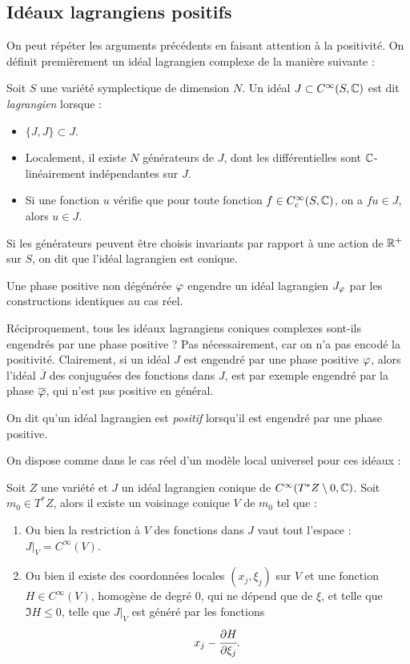 \subsection{Idéaux lagrangiens positifs}
On peut répéter les arguments précédents en faisant attention à la positivité. On définit premièrement un idéal lagrangien complexe de la manière suivante :

\begin{defn}Soit $S$ une variété symplectique de dimension $N$. Un idéal $J \subset C^{\infty}(S,\mathbb{C})$ est dit \emph{lagrangien} lorsque :
	\begin{itemize}
		\item $\{J,J\}\subset J$.
		\item Localement, il existe $N$ générateurs de $J$, dont les différentielles sont $\mathbb{C}$-linéairement indépendantes sur $J$.
		\item Si une fonction $u$ vérifie que pour toute fonction $f \in C^{\infty}_c(S,\mathbb{C})$, on a $fu \in J$, alors $u \in J$.
	\end{itemize}
	Si les générateurs peuvent être choisis invariants par rapport à une action de $\mathbb{R}^+$ sur $S$, on dit que l'idéal lagrangien est conique.
\end{defn}

Une phase positive non dégénérée $\varphi$ engendre un idéal lagrangien $J_{\varphi}$ par les constructions identiques au cas réel.

Réciproquement, tous les idéaux lagrangiens coniques complexes sont-ils engendrés par une phase positive ? Pas nécessairement, car on n'a pas encodé la positivité. Clairement, si un idéal $J$ est engendré par une phase positive $\varphi$, alors l'idéal $\overline{J}$ des conjuguées des fonctions dans $J$, est par exemple engendré par la phase $\overline{\varphi}$, qui n'est pas positive en général.
\begin{defn}
	On dit qu'un idéal lagrangien est \emph{positif} lorsqu'il est engendré par une phase positive.
\end{defn}

On dispose comme dans le cas réel d'un modèle local universel pour ces idéaux :
\begin{lem}
	Soit $Z$ une variété et $J$ un idéal lagrangien conique de $C^{\infty}(T^*Z \setminus 0,\mathbb{C})$. Soit $m_0\in T^*Z$, alors il existe un voisinage conique $V$ de $m_0$ tel que :
	\begin{enumerate}
		\item Ou bien la restriction à $V$ des fonctions dans $J$ vaut tout l'espace : $J|_V = C^{\infty}(V)$.
		\item Ou bien il existe des coordonnées locales $(x_j,\xi_j)$ sur $V$ et une fonction $H\in C^{\infty}(V)$, homogène de degré 0, qui ne dépend que de $\xi$, et telle que ${\Im H \leq 0}$, telle que $J|_{V}$ est généré par les fonctions
		\begin{equation*}
		x_j-\cfrac{\partial H}{\partial \xi_j}.
		\end{equation*}
	\end{enumerate} 
\end{lem}

